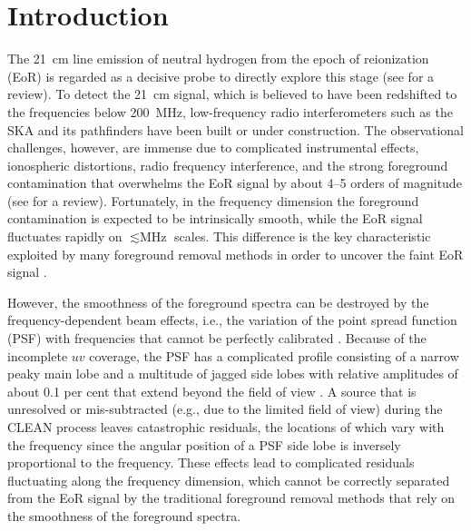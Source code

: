 \documentclass[fleqn,usenatbib]{mnras}
\begin{document}
\section{Introduction}
\label{sec:intro}

The \SI{21}{\cm} line emission of neutral hydrogen from the epoch of
reionization (EoR) is regarded as a decisive probe to directly explore
this stage (see \citealt{furlanetto2016rev} for a review).
To detect the \SI{21}{\cm} signal, which is believed to have been
redshifted to the frequencies below \SI{200}{\MHz}, low-frequency
radio interferometers such as the SKA \citep{koopmans2015rev} and its
pathfinders have been built or under construction.
The observational challenges, however, are immense due to
complicated instrumental effects, ionospheric distortions, radio frequency
interference, and the strong foreground contamination that
overwhelms the EoR signal by about \numrange{4}{5} orders of magnitude
(see \citealt{morales2010rev} for a review).
Fortunately, in the frequency dimension the foreground contamination
is expected to be intrinsically smooth, while the EoR signal fluctuates
rapidly on $\lesssim \si{\MHz}$ scales.
This difference is the key characteristic exploited by many foreground
removal methods in order to uncover the faint EoR signal
\citep[e.g.,][]{wang2006,jelic2008,liu2009fgrm,harker2009,chapman2012,chapman2013,wang2013,gu2013,bonaldi2015,mertens2018}.

However, the smoothness of the foreground spectra can be destroyed by
the frequency-dependent beam effects, i.e., the variation of the point
spread function (PSF) with frequencies that cannot be perfectly
calibrated \citep{liu2009ps}.
Because of the incomplete $uv$ coverage,
the PSF has a complicated profile consisting of a narrow peaky main lobe
and a multitude of jagged side lobes with relative amplitudes of about
0.1 per cent that extend beyond the field of view
\citep[e.g.,][their figures 1 and 3]{liu2009ps}.
A source that is unresolved or mis-subtracted (e.g., due to the limited
field of view) during the CLEAN process leaves catastrophic residuals,
the locations of which vary with the frequency since the angular
position of a PSF side lobe is inversely proportional to the frequency.
These effects lead to complicated residuals fluctuating along the
frequency dimension, which cannot be correctly separated from the EoR
signal by the traditional foreground removal methods that rely on
the smoothness of the foreground spectra.
\end{document}
